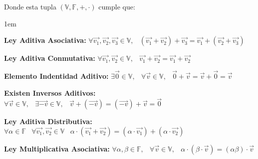\documentclass[12pt, fleqn]{report}                             %
\newenvironment{Indentation}[1][0.75em]                         %
    {\begin{adjustwidth}{#1}{}}                                     %
    {\end{adjustwidth}}                                             %
\DeclareMathOperator \Space {\quad}                             %
\DeclareMathOperator \MiniSpace {\;}                            %
\begin{document}
            \vspace{30pt}
            
            Donde esta tupla $(\mathbb{V}, \mathbb{F}, +, \cdot)$ cumple que:
            
            \begin{Indentation}[1em]
            \begin{itemize}
            \small{
                
                \item 
                    \textbf{Ley Aditiva Asociativa:}
                    $\forall \vec{v_1}, \vec{v_2}, \vec{v_3} \in \mathbb{V}, \MiniSpace
                        (\vec{v_1} + \vec{v_2}) + \vec{v_3} = \vec{v_1} + (\vec{v_2} + \vec{v_3})$

                \item 
                    \textbf{Ley Aditiva Conmutativa:}
                    $\forall \vec{v_1}, \vec{v_2} \in \mathbb{V}, \MiniSpace
                            \vec{v_1} + \vec{v_2} = \vec{v_1} + \vec{v_2}$


                \item 
                    \textbf{Elemento Indentidad Aditivo:}
                    $\exists \vec{0} \in \mathbb{V}, \MiniSpace
                        \forall \vec{v} \in \mathbb{V}, \MiniSpace \vec{0} + \vec{v} = \vec{v} + \vec{0} = \vec{v}$

                \item 
                    \textbf{Existen Inversos Aditivos:}
                    $\forall \vec{v} \in \mathbb{V}, \MiniSpace
                            \exists \vec{-v} \in \mathbb{V}, \MiniSpace
                                \vec{v} + (\vec{-v}) = (\vec{-v}) + \vec{v} = \vec{0}$


                \item 
                    \textbf{Ley Aditiva Distributiva:}
                    $\forall \alpha \in \mathbb{F} \MiniSpace
                        \forall \vec{v_1}, \vec{v_2} \in \mathbb{V} \MiniSpace
                            \alpha \cdot (\vec{v_1} + \vec{v_2}) = 
                                (\alpha \cdot \vec{v_1}) + (\alpha \cdot \vec{v_2})$

                \item 
                    \textbf{Ley Multiplicativa Asociativa:}
                    $\forall \alpha, \beta \in \mathbb{F}, \MiniSpace
                        \forall \vec{v} \in \mathbb{V}, \MiniSpace
                            \alpha \cdot (\beta \cdot \vec{v}) = (\alpha \beta) \cdot \vec{v}$

}
\end{itemize}
\end{Indentation}
\end{document}
